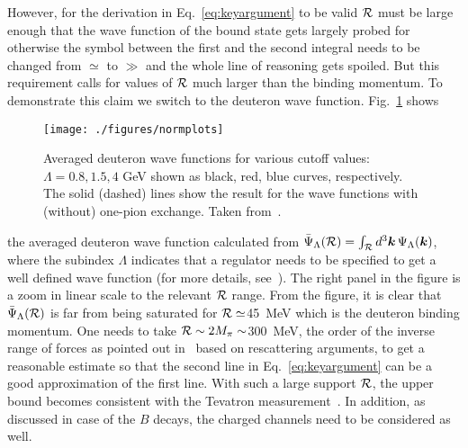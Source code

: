 However, for the derivation in Eq.~\eqref{eq:keyargument} to be valid  $\cal
R$ must be large enough that the wave function of the bound state
gets largely probed for otherwise the symbol between the first and the second
integral needs to be changed
from $\simeq$ to $\gg$ and the whole line of reasoning gets spoiled. But this requirement calls for
 values of $\cal R$ much larger than the binding momentum.
 To demonstrate this claim we switch to the deuteron wave function.
 Fig.~\ref{fig:wfaveraged} shows
\begin{figure}[t]
    \centering
    \texttt{[image: ./figures/normplots]}
    \caption{Averaged deuteron wave functions for various cutoff values:
$\Lambda = 0.8, 1.5, 4$ GeV shown as black, red, blue curves, respectively. The
solid (dashed) lines show the result for the wave functions with (without)
one-pion exchange. Taken from~\cite{Albaladejo:2017}.
\label{fig:wfaveraged}}
\end{figure}
the averaged deuteron wave function calculated from
$\bar \Psi_\Lambda({\cal R}) = \int_{\cal R} d^3 \bm{k} \,
\Psi_\Lambda(\bm{k})$,
where the subindex $\Lambda$ indicates that a regulator needs to be specified to
get a well defined wave function (for more details,
see~\cite{Nogga:2005fv}).
The right panel in the figure is a zoom in linear scale to the relevant $\cal R$
range. From the figure, it is clear that $\bar \Psi_\Lambda({\cal R})$ is far
from being saturated for ${\cal R}\simeq$45~MeV which is the deuteron binding
momentum. One needs to take ${\cal R}\sim 2M_\pi\sim$300~MeV, the order of the
inverse range of forces as pointed out
in~\cite{Artoisenet:2009wk,Artoisenet:2010uu} based on rescattering arguments,
to get a reasonable estimate so that the second line in
Eq.~\eqref{eq:keyargument} can be a good approximation of the first line. With
such a large support $\cal R$, the upper bound becomes
consistent with the Tevatron
measurement~\cite{Bignamini:2009sk,Artoisenet:2009wk,Artoisenet:2010uu}.
In addition, as discussed in case of the $B$ decays, the charged channels need
to be considered as well.


